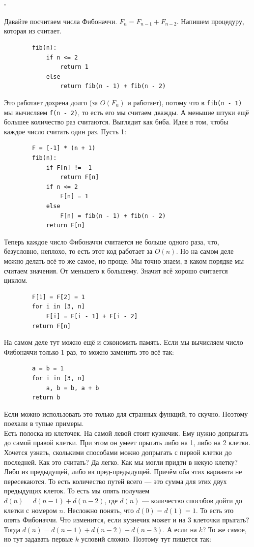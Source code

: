 \documentclass{article}
\newcommand{\pseudo}{PseudoLexer.py:PseudoLexer -x}
\newcommand{\pseudocode}[1]{\texttt{#1}}
\begin{document}
    \paragraph{.}
    Давайте посчитаем числа Фибоначчи. $F_n=F_{n-1}+F_{n-2}$. Напишем процедуру, которая из считает.
    \begin{verbatim}
        fib(n):
            if n <= 2
                return 1
            else
                return fib(n - 1) + fib(n - 2)
    \end{verbatim}
    Это работает дохрена долго (за $O(F_n)$ и работает), потому что в \pseudocode{fib(n - 1)} мы вычисляем \pseudocode{f(n - 2)}, то есть его мы считаем дважды. А меньшие штуки ещё большее количество раз считаются. Выглядит как биба. Идея в том, чтобы каждое число считать один раз. Пусть 1:
    \begin{verbatim}
        F = [-1] * (n + 1)
        fib(n):
            if F[n] != -1
                return F[n]
            if n <= 2
                F[n] = 1
            else
                F[n] = fib(n - 1) + fib(n - 2)
            return F[n]
    \end{verbatim}
    Теперь каждое число Фибоначчи считается не больше одного раза, что, безусловно, неплохо, то есть этот код работает за $O(n)$.
    Но на самом деле можно делать всё то же самое, но проще. Мы точно знаем, в каком порядке мы считаем значения. От меньшего к большему. Значит всё хорошо считается циклом.
    \begin{verbatim}
        F[1] = F[2] = 1
        for i in [3, n]
            F[i] = F[i - 1] + F[i - 2]
        return F[n]
    \end{verbatim}
    На самом деле тут можно ещё и сэкономить память. Если мы вычисляем число Фибоначчи только 1 раз, то можно заменить это всё так:
    \begin{verbatim}
        a = b = 1
        for i in [3, n]
            a, b = b, a + b
        return b
    \end{verbatim}
    Если можно использовать это только для странных функций, то скучно. Поэтому поехали в тупые примеры.\\
    Есть полоска из клеточек. На самой левой стоит кузнечик. Ему нужно допрыгать до самой правой клетки. При этом он умеет прыгать либо на 1, либо на 2 клетки. Хочется узнать, сколькими способами можно допрыгать с первой клетки до последней. Как это считать? Да легко. Как мы могли придти в некую клетку? Либо из предыдущей, либо из пред-предыдущей. Причём оба этих варианта не пересекаются. То есть количество путей всего --- это сумма для этих двух предыдущих клеток. То есть мы опять получаем $d(n)=d(n-1)+d(n-2)$, где $d(n)$ --- количество способов дойти до клетки с номером $n$. Несложно понять, что $d(0)=d(1)=1$. То есть это опять Фибоначчи. Что изменится, если кузнечик может и на 3 клеточки прыгать? Тогда $d(n)=d(n-1)+d(n-2)+d(n-3)$. А если на $k$? То же самое, но тут задавать первые $k$ условий сложно. Поэтому тут пишется так:
\end{document}

